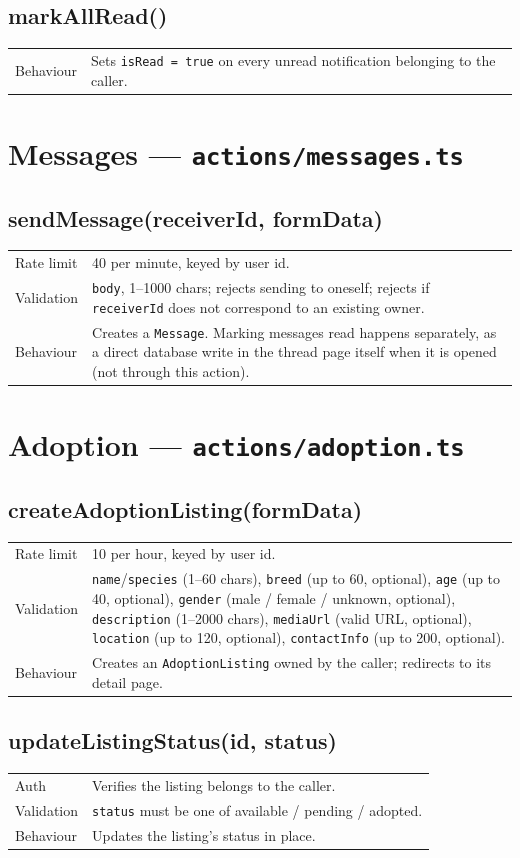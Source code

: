 \documentclass[11pt,a4paper]{article}
\makeatletter
\newcommand{\actiontable}[1]{%
  \begin{tabular}{@{}p{2.6cm}p{10.9cm}@{}}
  #1
  \end{tabular}
}
\makeatother
\begin{document}
\subsection{markAllRead()}
\actiontable{
Behaviour & Sets \texttt{isRead = true} on every unread notification belonging to the
  caller. \\
}

\section{Messages --- \texttt{actions/messages.ts}}

\subsection{sendMessage(receiverId, formData)}
\actiontable{
Rate limit & 40 per minute, keyed by user id. \\
Validation & \texttt{body}, 1--1000 chars; rejects sending to oneself; rejects if
  \texttt{receiverId} does not correspond to an existing owner. \\
Behaviour & Creates a \texttt{Message}. Marking messages read happens separately, as a
  direct database write in the thread page itself when it is opened (not through this
  action). \\
}

\section{Adoption --- \texttt{actions/adoption.ts}}

\subsection{createAdoptionListing(formData)}
\actiontable{
Rate limit & 10 per hour, keyed by user id. \\
Validation & \texttt{name}/\texttt{species} (1--60 chars), \texttt{breed} (up to 60,
  optional), \texttt{age} (up to 40, optional), \texttt{gender} (male / female /
  unknown, optional), \texttt{description} (1--2000 chars), \texttt{mediaUrl} (valid
  URL, optional), \texttt{location} (up to 120, optional), \texttt{contactInfo} (up to
  200, optional). \\
Behaviour & Creates an \texttt{AdoptionListing} owned by the caller; redirects to its
  detail page. \\
}

\subsection{updateListingStatus(id, status)}
\actiontable{
Auth & Verifies the listing belongs to the caller. \\
Validation & \texttt{status} must be one of available / pending / adopted. \\
Behaviour & Updates the listing's status in place. \\
}
\end{document}
